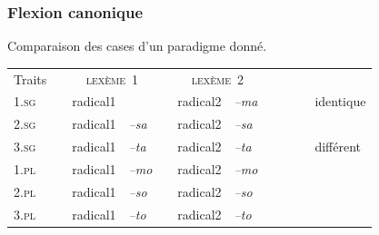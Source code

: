 \begin{frame}
\frametitle{Flexion canonique}
Comparaison des cases d'un paradigme donné.

\scriptsize

\begin{table}
\begin{tabular}{|l| p{1mm}|ll|p{1mm}|ll|p{1mm}cl}
\cline{1-1}\cline{3-4}\cline{6-7}
Traits&&\multicolumn{2}{|c|}{\cellcolor{white}\textsc{ lexème~1}}&&\multicolumn{2}{|c|}{\textsc{ lexème~2}}&&\\
\cline{1-1}\cline{3-4}\cline{6-7}
\textsc{1.sg}&& \cellcolor{ciel}radical1& \cellcolor{mandarine}{\em --ma}&&radical2& {\em
  --ma}&&\cellcolor{ciel}~~~&identique\\
\cline{1-1}\cline{3-4}\cline{6-7}
\textsc{2.sg}& &\cellcolor{ciel}radical1&{\em --sa}&&radical2& {\em --sa}&&&\\
\cline{1-1}\cline{3-4}\cline{6-7}

\textsc{3.sg}&& \cellcolor{ciel}radical1&{\em --ta}&&radical2& {\em
  --ta}&&\cellcolor{mandarine}&différent\\
\cline{1-1}\cline{3-4}\cline{6-7}
\textsc{1.pl}&&\cellcolor{ciel}radical1& {\em --mo}&&radical2& {\em --mo}&&\\
\cline{1-1}\cline{3-4}\cline{6-7}
\textsc{2.pl}&&\cellcolor{ciel}radical1& {\em --so}&&radical2& {\em --so}&&\\
\cline{1-1}\cline{3-4}\cline{6-7}
\textsc{3.pl}&&\cellcolor{ciel}radical1& {\em --to}&&radical2& {\em --to}&&\\
\cline{1-1}\cline{3-4}\cline{6-7}
\end{tabular}\\[1mm]
\end{table}
\end{frame}

